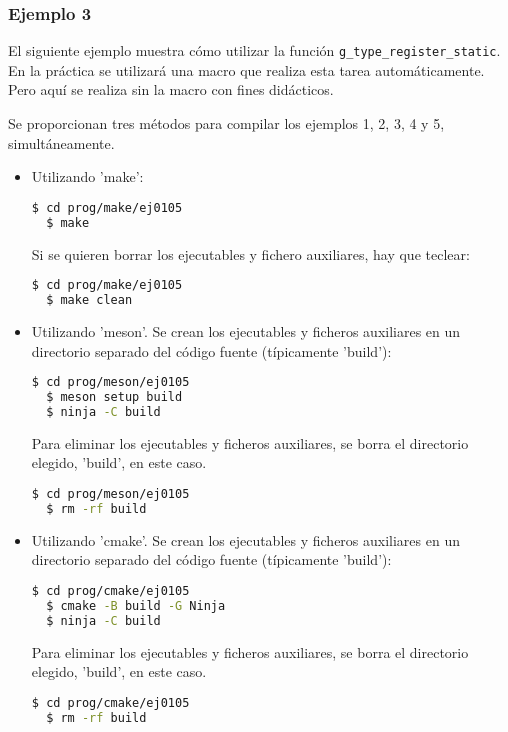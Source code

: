 \subsubsection{Ejemplo 3}
El siguiente ejemplo muestra cómo utilizar la función \texttt{g\_type\_register\_static}.
En la práctica se utilizará una macro que realiza esta tarea automáticamente. Pero aquí se realiza sin
la macro con fines didácticos.

Se proporcionan tres métodos para compilar los ejemplos 1, 2, 3, 4 y 5, simultáneamente.
\begin{itemize}
  \tightlist
\item Utilizando 'make':
\begin{lstlisting}[language=bash]
  $ cd prog/make/ej0105
  $ make
\end{lstlisting}
Si se quieren borrar los ejecutables y fichero auxiliares, hay que teclear:
\begin{lstlisting}[language=bash]
  $ cd prog/make/ej0105
  $ make clean
\end{lstlisting}
\item Utilizando 'meson'.
  Se crean los ejecutables y ficheros auxiliares en un directorio separado del código fuente
  (típicamente 'build'):
\begin{lstlisting}[language=bash]
  $ cd prog/meson/ej0105
  $ meson setup build
  $ ninja -C build
\end{lstlisting}
Para eliminar los ejecutables y ficheros auxiliares, se borra el directorio elegido, 'build', en este caso.
\begin{lstlisting}[language=bash]
  $ cd prog/meson/ej0105
  $ rm -rf build
\end{lstlisting}
\item Utilizando 'cmake'.
  Se crean los ejecutables y ficheros auxiliares en un directorio separado del código fuente
  (típicamente 'build'):
\begin{lstlisting}[language=bash]
  $ cd prog/cmake/ej0105
  $ cmake -B build -G Ninja
  $ ninja -C build
\end{lstlisting}
Para eliminar los ejecutables y ficheros auxiliares, se borra el directorio elegido, 'build', en este caso.
\begin{lstlisting}[language=bash]
  $ cd prog/cmake/ej0105
  $ rm -rf build
\end{lstlisting}
\end{itemize}

